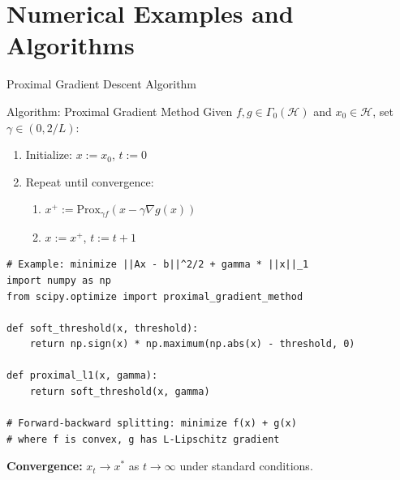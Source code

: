 \documentclass[aspectratio=169,10pt]{beamer}
\begin{document}
\section{Numerical Examples and Algorithms}

\begin{frame}[fragile]{Proximal Gradient Descent Algorithm}

\begin{exampleblock}{Algorithm: Proximal Gradient Method}
Given $f, g \in \Gamma_0(\mathcal{H})$ and $x_0 \in \mathcal{H}$, set $\gamma \in (0, 2/L)$:
\begin{enumerate}
    \item Initialize: $x := x_0$, $t := 0$
    \item Repeat until convergence:
    \begin{enumerate}
        \item $x^{+} := \mathrm{Prox}_{\gamma f}(x - \gamma \nabla g(x))$
        \item $x := x^{+}$, $t := t + 1$
    \end{enumerate}
\end{enumerate}
\end{exampleblock}

\vspace{0.2cm}

\begin{lstlisting}
# Example: minimize ||Ax - b||^2/2 + gamma * ||x||_1
import numpy as np
from scipy.optimize import proximal_gradient_method

def soft_threshold(x, threshold):
    return np.sign(x) * np.maximum(np.abs(x) - threshold, 0)

def proximal_l1(x, gamma):
    return soft_threshold(x, gamma)

# Forward-backward splitting: minimize f(x) + g(x)
# where f is convex, g has L-Lipschitz gradient
\end{lstlisting}

\vspace{0.2cm}

\textbf{Convergence:} $x_t \to x^*$ as $t \to \infty$ under standard conditions.
\end{frame}
\end{document}
